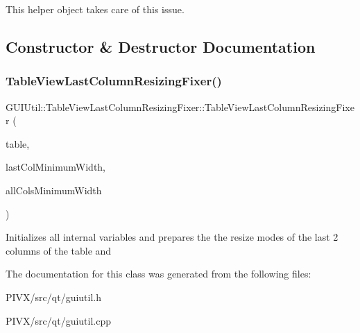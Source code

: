 This helper object takes care of this issue. 

\subsection{Constructor \& Destructor Documentation}
\mbox{\label{class_g_u_i_util_1_1_table_view_last_column_resizing_fixer_a25687ab7a88da518b48d7355dc9aa22d}} 
\subsubsection{\texorpdfstring{Table\+View\+Last\+Column\+Resizing\+Fixer()}{TableViewLastColumnResizingFixer()}}
{\footnotesize\ttfamily G\+U\+I\+Util\+::\+Table\+View\+Last\+Column\+Resizing\+Fixer\+::\+Table\+View\+Last\+Column\+Resizing\+Fixer (\begin{DoxyParamCaption}\item[{Q\+Table\+View $\ast$}]{table,  }\item[{int}]{last\+Col\+Minimum\+Width,  }\item[{int}]{all\+Cols\+Minimum\+Width }\end{DoxyParamCaption})}

Initializes all internal variables and prepares the the resize modes of the last 2 columns of the table and 

The documentation for this class was generated from the following files\+:\begin{DoxyCompactItemize}
\item 
P\+I\+V\+X/src/qt/guiutil.\+h\item 
P\+I\+V\+X/src/qt/guiutil.\+cpp\end{DoxyCompactItemize}
